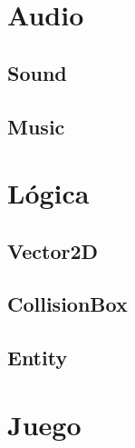 \documentclass[parskip=half*]{scrartcl}
\begin{document}

\newpage
\section{Audio}
	\subsection{Sound}

	\subsection{Music}


\newpage
\section{L\'ogica}
	\subsection{Vector2D}

	\subsection{CollisionBox}


	\subsection{Entity}


\newpage
\section{Juego}
\end{document}
